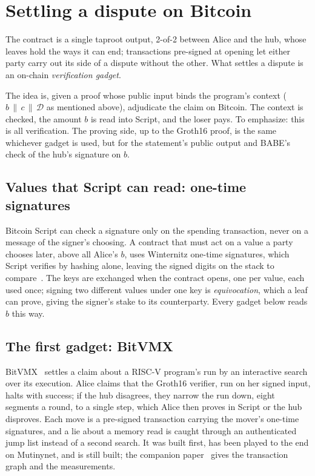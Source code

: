 \documentclass[11pt]{article}
\begin{document}
\section{Settling a dispute on Bitcoin}
\label{sec:blocks}

The contract is a single taproot output, 2-of-2 between Alice and the
hub, whose leaves hold the ways it can end; transactions pre-signed at
opening let either party carry out its side of a dispute without the
other. What settles a dispute is an on-chain \emph{verification gadget}.

The idea is, given a proof whose public input binds the
program's context ($b \,\|\, c \,\|\, \mathcal{D}$ as mentioned above), adjudicate the
claim on Bitcoin. The context is checked, the amount $b$ is read into Script, and the loser pays. To emphasize: this is all verification. The proving side, up to the Groth16 proof, is the same whichever gadget is used, but for the statement's public output and BABE's check of the hub's signature on $b$.

\subsection{Values that Script can read: one-time signatures}

Bitcoin Script can check a signature only on the spending transaction,
never on a message of the signer's choosing. A contract that must act on
a value a party chooses later, above all Alice's $b$, uses Winternitz
one-time signatures, which Script verifies by hashing alone, leaving the
signed digits on the stack to compare~\cite{bitvm,bitvmx}. The keys are
exchanged when the contract opens, one per value, each used once;
signing two different values under one key is \emph{equivocation},
which a leaf can prove, giving the signer's stake to its counterparty.
Every gadget below reads $b$ this way.

\subsection{The first gadget: BitVMX}

BitVMX~\cite{bitvmx} settles a claim about a RISC-V program's run by an
interactive search over its execution. Alice claims that the Groth16
verifier, run on her signed input, halts with success; if the hub
disagrees, they narrow the run down, eight segments a round, to a single
step, which Alice then proves in Script or the hub disproves. Each move
is a pre-signed transaction carrying the mover's one-time signatures,
and a lie about a memory read is caught through an authenticated jump
list instead of a second search. It was built first, has been played to
the end on Mutinynet, and is still built; the companion
paper~\cite{lichenbitvmx} gives the transaction graph and the
measurements.
\end{document}
